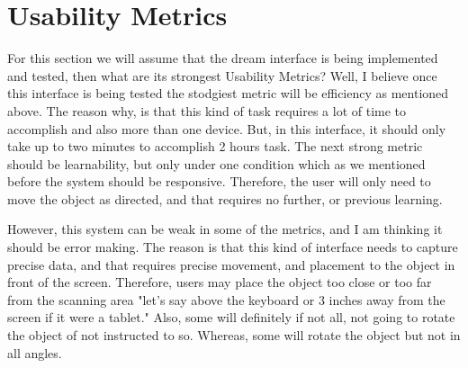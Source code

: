 \documentclass[12pt, oneside]{amsart}   	%
\begin{document}
\section{Usability Metrics}

For this section we will assume that the dream interface is being implemented and tested, then what are its strongest Usability Metrics?  Well, I believe once this interface is being tested the stodgiest metric will be efficiency as mentioned above.  The reason why, is that this kind of task requires a lot of time to accomplish and also more than one device. But, in this interface, it should only take up to two minutes to accomplish 2 hours task.  The next strong metric should be learnability, but only under one condition which as we mentioned before the system should be responsive.  Therefore, the user will only need to move the object as directed, and that requires no further, or previous learning. 
%

However, this system can be weak in some of the metrics, and I am thinking it should be error making.  The reason is that this kind of interface needs to capture precise data, and that requires precise movement, and placement to the object in front of the screen.  Therefore, users may place the object too close or too far from the scanning area "let's say above the keyboard or 3 inches away from the screen if it were a tablet."  Also, some will definitely if not all, not going to rotate the object of not instructed to so. Whereas, some will rotate the object but not in all angles.  
\end{document}
